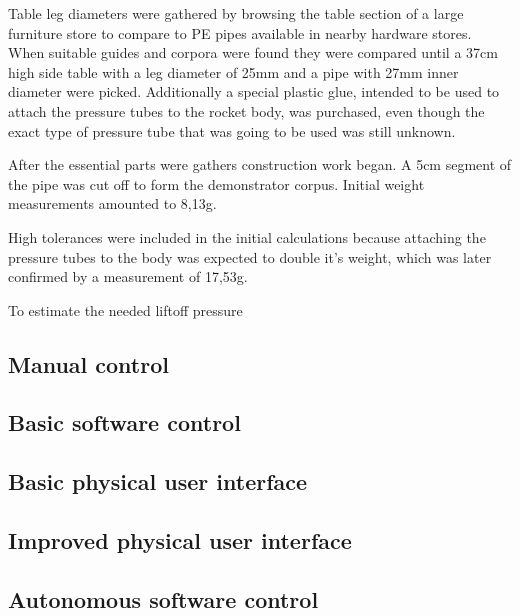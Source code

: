 Table leg diameters were gathered by browsing the table section of a large furniture store to compare to PE pipes available in nearby hardware stores. When suitable guides and corpora were found they were compared until a 37cm high side table with a leg diameter of 25mm and a pipe with 27mm inner diameter were picked. Additionally a special plastic glue, intended to be used to attach the pressure tubes to the rocket body, was purchased, even though the exact type of pressure tube that was going to be used was still unknown.

After the essential parts were gathers construction work began. A 5cm segment of the pipe was cut off to form the demonstrator corpus. Initial weight measurements amounted to 8,13g. 


High tolerances were included in the initial calculations because attaching the pressure tubes to the body was expected to double it's weight, which was later confirmed by a measurement of 17,53g.

To estimate the needed liftoff pressure 


\subsection{Manual control}


\subsection{Basic software control}


\subsection{Basic physical user interface}


\subsection{Improved physical user interface}


\subsection{Autonomous software control}